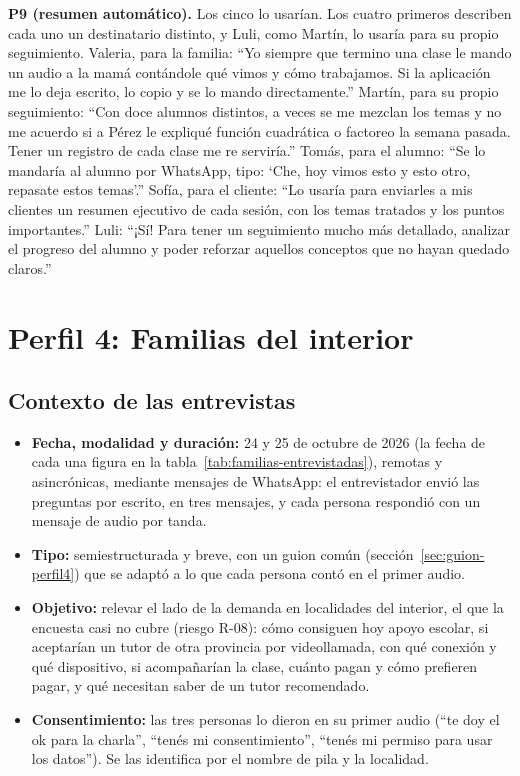 \textbf{P9 (resumen automático).} Los cinco lo usarían. Los cuatro
primeros describen cada uno un destinatario distinto, y Luli, como
Martín, lo usaría para su propio seguimiento. Valeria, para la familia: ``Yo
siempre que termino una clase le mando un audio a la mamá contándole qué
vimos y cómo trabajamos. Si la aplicación me lo deja escrito, lo copio y
se lo mando directamente.'' Martín, para su propio seguimiento: ``Con
doce alumnos distintos, a veces se me mezclan los temas y no me acuerdo
si a Pérez le expliqué función cuadrática o factoreo la semana pasada.
Tener un registro de cada clase me re serviría.'' Tomás, para el alumno:
``Se lo mandaría al alumno por WhatsApp, tipo: `Che, hoy vimos esto y
esto otro, repasate estos temas'.'' Sofía, para el cliente: ``Lo usaría
para enviarles a mis clientes un resumen ejecutivo de cada sesión, con
los temas tratados y los puntos importantes.'' Luli: ``¡Sí! Para tener
un seguimiento mucho más detallado, analizar el progreso del alumno y
poder reforzar aquellos conceptos que no hayan quedado claros.''

\section{Perfil 4: Familias del interior}

\subsection{Contexto de las entrevistas}

\begin{itemize}
    \item \textbf{Fecha, modalidad y duración:} 24 y 25 de octubre de
          2026 (la fecha de cada una figura en la
          tabla~\ref{tab:familias-entrevistadas}), remotas y
          asincrónicas, mediante mensajes de WhatsApp: el entrevistador
          envió las preguntas por escrito, en tres mensajes, y cada
          persona respondió con un mensaje de audio por tanda.
    \item \textbf{Tipo:} semiestructurada y breve, con un guion común
          (sección~\ref{sec:guion-perfil4}) que se adaptó a lo que cada
          persona contó en el primer audio.
    \item \textbf{Objetivo:} relevar el lado de la demanda en localidades
          del interior, el que la encuesta casi no cubre (riesgo R-08):
          cómo consiguen hoy apoyo escolar, si aceptarían un tutor de otra
          provincia por videollamada, con qué conexión y qué dispositivo,
          si acompañarían la clase, cuánto pagan y cómo prefieren pagar, y
          qué necesitan saber de un tutor recomendado.
    \item \textbf{Consentimiento:} las tres personas lo dieron en su primer
          audio (``te doy el ok para la charla'', ``tenés mi
          consentimiento'', ``tenés mi permiso para usar los datos''). Se
          las identifica por el nombre de pila y la localidad.
\end{itemize}

